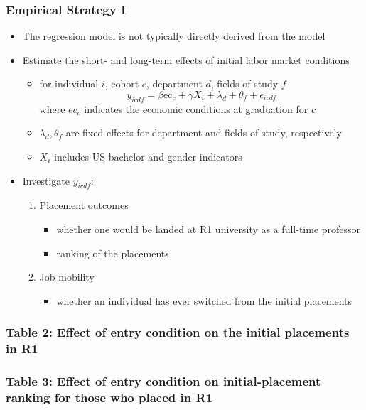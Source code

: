 \documentclass[10pt,svgnames,fragile]{beamer}
\begin{document}
{\begin{frame}
	\frametitle{Empirical Strategy I}
	\begin{itemize}
		\item The regression model is not typically directly derived from the  model
		\vfill
		\item Estimate the short- and long-term effects of initial labor market conditions 
			\begin{itemize}
				\item for individual $i$, cohort $c$, department $d$, fields of study $f$
				\begin{equation}
					y_{icdf} = \beta \text{ec}_{c}+\gamma X_{i}+\lambda_{d}+\theta_f  +\epsilon_{icdf}
				\end{equation}
				where $ec_c$ indicates the economic conditions at graduation for $c$
				\item $\lambda_{d},\theta_f $ are fixed effects for department and fields of study, respectively
				\item $X_i$ includes US bachelor and gender indicators
	\end{itemize}
	\vfill
			\item Investigate $y_{icdf}$:
			\begin{enumerate}
				\item Placement outcomes
				\begin{itemize}
					\item whether one would be landed at R1 university as a full-time professor
					\item ranking of the placements
				\end{itemize}
				\item Job mobility
				\begin{itemize}
				\item whether an individual has ever switched from the initial placements
				\end{itemize}
	\vfill
			\end{enumerate}
\end{itemize}
\end{frame}




{
\begin{frame}
	\frametitle{Table 2: Effect of entry condition on the initial placements in R1}
	
\end{frame}}

{
\begin{frame}
	\frametitle{Table 3: Effect of entry condition on  initial-placement ranking   for those who placed in R1}
	
\end{frame}}


}
\end{document}
